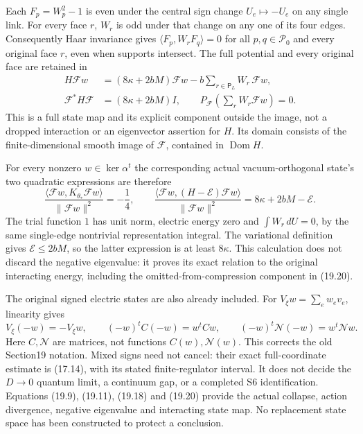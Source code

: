 \documentclass[
]{article}
\begin{document}
Each \(F_p=W_p^2-1\) is even under the central sign change
\(U_e\mapsto-U_e\) on any single link. For every face \(r\), \(W_r\) is
odd under that change on any one of its four edges. Consequently Haar
invariance gives \(\langle F_p,W_rF_q\rangle=0\) for all
\(p,q\in\mathcal P_0\) and every original face \(r\), even when supports
intersect. The full potential and every original face are retained in \[
\begin{aligned}
H\mathscr Fw&=(8\kappa+2bM)\mathscr Fw
             -b\sum_{r\in\mathsf P_L}W_r\,\mathscr Fw,\\
\mathscr F^*H\mathscr F&=(8\kappa+2bM)I,\qquad
P_{\mathscr F}\left(\sum_rW_r\mathscr Fw\right)=0.
\end{aligned}                                                    \tag{19.20}
\] This is a full state map and its explicit component outside the
image, not a dropped interaction or an eigenvector assertion for \(H\).
Its domain consists of the finite-dimensional smooth image of
\(\mathscr F\), contained in \(\operatorname{Dom}H\).

For every nonzero \(w\in\ker\alpha^t\) the corresponding actual
vacuum-orthogonal state's two quadratic expressions are therefore \[
\frac{\langle\mathscr Fw,K_{\theta_*}\mathscr Fw\rangle}
     {\|\mathscr Fw\|^2}=-\frac14,\qquad
\frac{\langle\mathscr Fw,(H-\mathcal E)\mathscr Fw\rangle}
     {\|\mathscr Fw\|^2}=8\kappa+2bM-\mathcal E.
                                                               \tag{19.21}
\] The trial function \(1\) has unit norm, electric energy zero and
\(\int W_r\,dU=0\), by the same single-edge nontrivial representation
integral. The variational definition gives \(\mathcal E\le2bM\), so the
latter expression is at least \(8\kappa\). This calculation does not
discard the negative eigenvalue: it proves its exact relation to the
original interacting energy, including the omitted-from-compression
component in (19.20).

The original signed electric states are also already included. For
\(V_\xi w=\sum_ew_ev_e\), linearity gives \[
V_\xi(-w)=-V_\xi w,\qquad
(-w)^tC(-w)=w^tCw,\qquad
(-w)^t\mathcal N(-w)=w^t\mathcal Nw.
                                                               \tag{19.22}
\] Here \(C,\mathcal N\) are matrices, not functions
\(C(w),\mathcal N(w)\). This corrects the old Section19 notation. Mixed
signs need not cancel: their exact full-coordinate estimate is (17.14),
with its stated finite-regulator interval. It does not decide the
\(D\to0\) quantum limit, a continuum gap, or a completed S6
identification. Equations (19.9), (19.11), (19.18) and (19.20) provide
the actual collapse, action divergence, negative eigenvalue and
interacting state map. No replacement state space has been constructed
to protect a conclusion.
\end{document}
